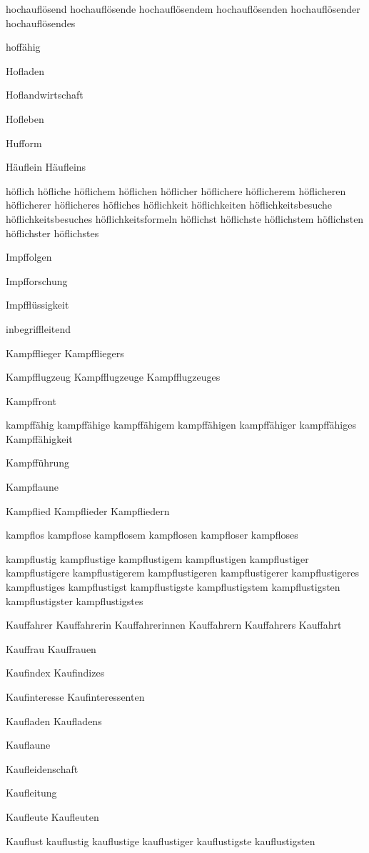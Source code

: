 hochauflösend hochauflösende hochauflösendem hochauflösenden hochauflösender hochauflösendes

hoffähig

Hofladen

Hoflandwirtschaft

Hofleben

Hufform

Häuflein Häufleins

höflich höfliche höflichem höflichen höflicher höflichere höflicherem höflicheren höflicherer höflicheres höfliches höflichkeit höflichkeiten höflichkeitsbesuche höflichkeitsbesuches höflichkeitsformeln höflichst höflichste höflichstem höflichsten höflichster höflichstes

Impffolgen

Impfforschung

Impfflüssigkeit

inbegriffleitend 

Kampfflieger Kampffliegers

Kampfflugzeug Kampfflugzeuge Kampfflugzeuges

Kampffront

kampffähig kampffähige kampffähigem kampffähigen kampffähiger kampffähiges Kampffähigkeit

Kampfführung

Kampflaune

Kampflied Kampflieder Kampfliedern

kampflos kampflose kampflosem kampflosen kampfloser kampfloses

kampflustig kampflustige kampflustigem kampflustigen kampflustiger kampflustigere kampflustigerem kampflustigeren kampflustigerer kampflustigeres kampflustiges kampflustigst kampflustigste kampflustigstem kampflustigsten kampflustigster kampflustigstes

Kauffahrer Kauffahrerin Kauffahrerinnen Kauffahrern Kauffahrers
Kauffahrt

Kauffrau Kauffrauen

Kaufindex Kaufindizes

Kaufinteresse Kaufinteressenten

Kaufladen Kaufladens

Kauflaune

Kaufleidenschaft

Kaufleitung

Kaufleute Kaufleuten

Kauflust kauflustig kauflustige kauflustiger kauflustigste kauflustigsten

